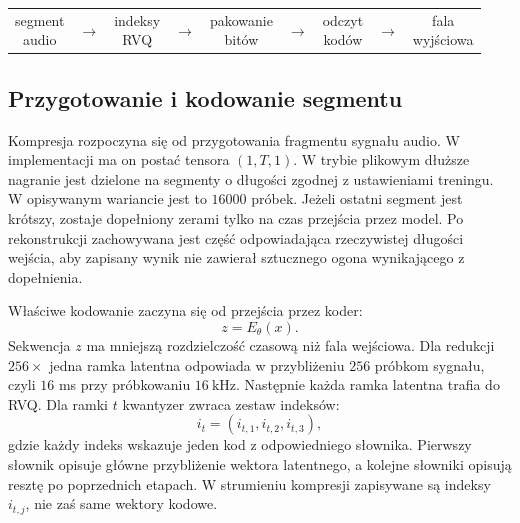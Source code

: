 \begin{center}
\centering
\footnotesize
\setlength{\tabcolsep}{3pt}
\begin{tabular}{c c c c c c c c c}
\fbox{\parbox{0.115\textwidth}{\centering segment\\audio}} &
\(\rightarrow\) &
\fbox{\parbox{0.115\textwidth}{\centering indeksy\\RVQ}} &
\(\rightarrow\) &
\fbox{\parbox{0.115\textwidth}{\centering pakowanie\\bitów}} &
\(\rightarrow\) &
\fbox{\parbox{0.115\textwidth}{\centering odczyt\\kodów}} &
\(\rightarrow\) &
\fbox{\parbox{0.115\textwidth}{\centering fala\\wyjściowa}} \\
\end{tabular}
\label{fig:proces-kompresji}
\end{center}

\subsection{Przygotowanie i kodowanie segmentu}

Kompresja rozpoczyna się od przygotowania fragmentu sygnału audio. W implementacji ma on postać tensora \((1,T,1)\). W trybie plikowym dłuższe nagranie jest dzielone na segmenty o długości zgodnej z ustawieniami treningu. W opisywanym wariancie jest to \(16000\) próbek. Jeżeli ostatni segment jest krótszy, zostaje dopełniony zerami tylko na czas przejścia przez model. Po rekonstrukcji zachowywana jest część odpowiadająca rzeczywistej długości wejścia, aby zapisany wynik nie zawierał sztucznego ogona wynikającego z dopełnienia.

Właściwe kodowanie zaczyna się od przejścia przez koder:
\[
z = E_\theta(x).
\]
Sekwencja \(z\) ma mniejszą rozdzielczość czasową niż fala wejściowa. Dla redukcji \(256\times\) jedna ramka latentna odpowiada w przybliżeniu \(256\) próbkom sygnału, czyli \(16\) ms przy próbkowaniu \(16\ \mathrm{kHz}\). Następnie każda ramka latentna trafia do RVQ. Dla ramki \(t\) kwantyzer zwraca zestaw indeksów:
\[
i_t = (i_{t,1}, i_{t,2}, i_{t,3}),
\]
gdzie każdy indeks wskazuje jeden kod z odpowiedniego słownika. Pierwszy słownik opisuje główne przybliżenie wektora latentnego, a kolejne słowniki opisują resztę po poprzednich etapach. W strumieniu kompresji zapisywane są indeksy \(i_{t,j}\), nie zaś same wektory kodowe.


